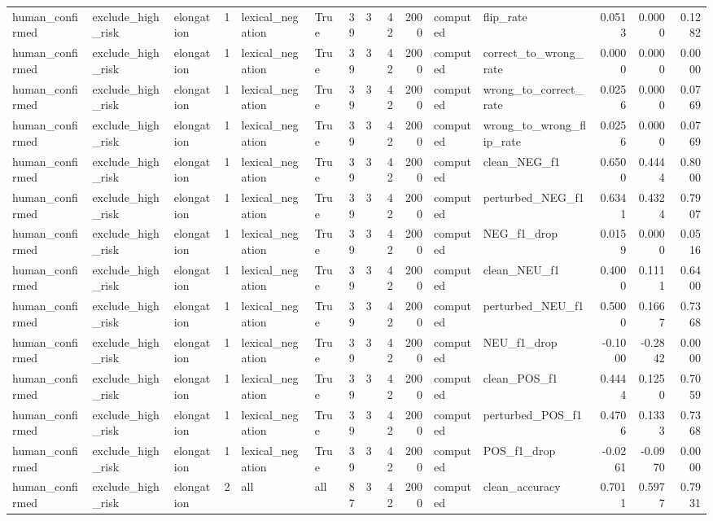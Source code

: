\begin{tabular}{lllrllrrrrllrrr}
human_confirmed & exclude_high_risk & elongation & 1 & lexical_negation & True & 39 & 3 & 42 & 2000 & computed & flip_rate & 0.0513 & 0.0000 & 0.1282 \\
human_confirmed & exclude_high_risk & elongation & 1 & lexical_negation & True & 39 & 3 & 42 & 2000 & computed & correct_to_wrong_rate & 0.0000 & 0.0000 & 0.0000 \\
human_confirmed & exclude_high_risk & elongation & 1 & lexical_negation & True & 39 & 3 & 42 & 2000 & computed & wrong_to_correct_rate & 0.0256 & 0.0000 & 0.0769 \\
human_confirmed & exclude_high_risk & elongation & 1 & lexical_negation & True & 39 & 3 & 42 & 2000 & computed & wrong_to_wrong_flip_rate & 0.0256 & 0.0000 & 0.0769 \\
human_confirmed & exclude_high_risk & elongation & 1 & lexical_negation & True & 39 & 3 & 42 & 2000 & computed & clean_NEG_f1 & 0.6500 & 0.4444 & 0.8000 \\
human_confirmed & exclude_high_risk & elongation & 1 & lexical_negation & True & 39 & 3 & 42 & 2000 & computed & perturbed_NEG_f1 & 0.6341 & 0.4324 & 0.7907 \\
human_confirmed & exclude_high_risk & elongation & 1 & lexical_negation & True & 39 & 3 & 42 & 2000 & computed & NEG_f1_drop & 0.0159 & 0.0000 & 0.0516 \\
human_confirmed & exclude_high_risk & elongation & 1 & lexical_negation & True & 39 & 3 & 42 & 2000 & computed & clean_NEU_f1 & 0.4000 & 0.1111 & 0.6400 \\
human_confirmed & exclude_high_risk & elongation & 1 & lexical_negation & True & 39 & 3 & 42 & 2000 & computed & perturbed_NEU_f1 & 0.5000 & 0.1667 & 0.7368 \\
human_confirmed & exclude_high_risk & elongation & 1 & lexical_negation & True & 39 & 3 & 42 & 2000 & computed & NEU_f1_drop & -0.1000 & -0.2842 & 0.0000 \\
human_confirmed & exclude_high_risk & elongation & 1 & lexical_negation & True & 39 & 3 & 42 & 2000 & computed & clean_POS_f1 & 0.4444 & 0.1250 & 0.7059 \\
human_confirmed & exclude_high_risk & elongation & 1 & lexical_negation & True & 39 & 3 & 42 & 2000 & computed & perturbed_POS_f1 & 0.4706 & 0.1333 & 0.7368 \\
human_confirmed & exclude_high_risk & elongation & 1 & lexical_negation & True & 39 & 3 & 42 & 2000 & computed & POS_f1_drop & -0.0261 & -0.0970 & 0.0000 \\
human_confirmed & exclude_high_risk & elongation & 2 & all & all & 87 & 3 & 42 & 2000 & computed & clean_accuracy & 0.7011 & 0.5977 & 0.7931 \\

\end{tabular}
